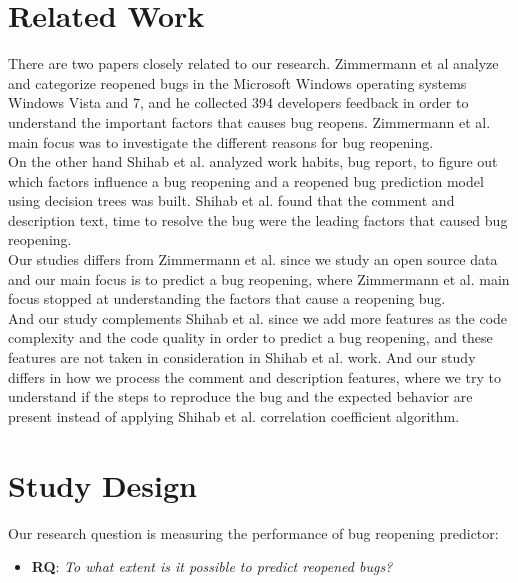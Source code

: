 \documentclass[sigconf,review]{acmart}
\begin{document}
\section{Related Work}
There are two papers closely related to our research. Zimmermann et al \cite{Zimmerman:reopen} analyze and categorize reopened bugs in the Microsoft Windows operating systems Windows Vista and 7, and he collected 394 developers feedback in order to understand the important factors that causes bug reopens. Zimmermann et al. main focus was to investigate the different reasons for bug reopening.\\
On the other hand Shihab et al.\cite{Shihab:wcre} analyzed work habits, bug report, to figure out which factors influence a bug reopening and a reopened bug prediction model using decision trees was built. Shihab et al. found that the comment and description text, time to resolve the bug were the leading factors that caused bug reopening. \\
Our studies differs from Zimmermann et al. since we study an open source data and our main focus is to predict a bug reopening, where Zimmermann et al. main focus stopped at understanding the factors that cause a reopening bug.\\
And our study complements Shihab et al.\cite{Shihab:wcre} since we add more features as the code complexity and the code quality in order to predict a bug reopening, and these features are not taken in consideration in Shihab et al. work. And our study differs in how we process the comment and description features, where we try to understand if the steps to reproduce the bug and the expected behavior are present instead of applying Shihab et al. correlation coefficient algorithm.
\newpage


\section{Study Design}
Our research question is measuring the performance of bug reopening predictor:
\begin{itemize}
\item \textbf{RQ}: \emph{To what extent is it possible to predict reopened bugs?}
\end{itemize}
\end{document}
